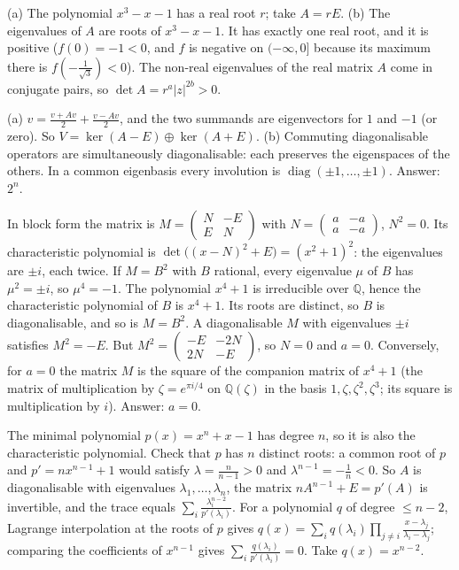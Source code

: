 \documentclass[11pt,a4paper]{article}
\begin{document}
(a) The polynomial \(x^3-x-1\) has a real root \(r\); take \(A=rE\).
(b) The eigenvalues of \(A\) are roots of \(x^3-x-1\). It has exactly one real root, and it is positive (\(f(0)=-1\lt0\), and \(f\) is negative on \((-\infty,0]\) because its maximum there is \(f(-\frac1{\sqrt3})\lt0\)). The non-real eigenvalues of the real matrix \(A\) come in conjugate pairs, so \(\det A=r^a|z|^{2b}\gt0\).

(a) \(v=\frac{v+Av}2+\frac{v-Av}2\), and the two summands are eigenvectors for \(1\) and \(-1\) (or zero). So \(V=\ker(A-E)\oplus\ker(A+E)\).
(b) Commuting diagonalisable operators are simultaneously diagonalisable: each preserves the eigenspaces of the others. In a common eigenbasis every involution is \(\operatorname{diag}(\pm1,\dots,\pm1)\). Answer: \(2^n\).

In block form the matrix is \(M=\begin{pmatrix}N&-E\\E&N\end{pmatrix}\) with \(N=\begin{pmatrix}a&-a\\a&-a\end{pmatrix}\), \(N^2=0\). Its characteristic polynomial is \(\det\bigl((x-N)^2+E\bigr)=(x^2+1)^2\): the eigenvalues are \(\pm i\), each twice.
If \(M=B^2\) with \(B\) rational, every eigenvalue \(\mu\) of \(B\) has \(\mu^2=\pm i\), so \(\mu^4=-1\). The polynomial \(x^4+1\) is irreducible over \(\mathbb Q\), hence the characteristic polynomial of \(B\) is \(x^4+1\). Its roots are distinct, so \(B\) is diagonalisable, and so is \(M=B^2\).
A diagonalisable \(M\) with eigenvalues \(\pm i\) satisfies \(M^2=-E\). But \(M^2=\begin{pmatrix}-E&-2N\\2N&-E\end{pmatrix}\), so \(N=0\) and \(a=0\). Conversely, for \(a=0\) the matrix \(M\) is the square of the companion matrix of \(x^4+1\) (the matrix of multiplication by \(\zeta=e^{\pi i/4}\) on \(\mathbb Q(\zeta)\) in the basis \(1,\zeta,\zeta^2,\zeta^3\); its square is multiplication by \(i\)). Answer: \(a=0\).

The minimal polynomial \(p(x)=x^n+x-1\) has degree \(n\), so it is also the characteristic polynomial. Check that \(p\) has \(n\) distinct roots: a common root of \(p\) and \(p'=nx^{n-1}+1\) would satisfy \(\lambda=\frac n{n-1}>0\) and \(\lambda^{n-1}=-\frac1n\lt0\).
So \(A\) is diagonalisable with eigenvalues \(\lambda_1,\dots,\lambda_n\), the matrix \(nA^{n-1}+E=p'(A)\) is invertible, and the trace equals \(\sum_i\frac{\lambda_i^{n-2}}{p'(\lambda_i)}\).
For a polynomial \(q\) of degree \(\le n-2\), Lagrange interpolation at the roots of \(p\) gives \(q(x)=\sum_iq(\lambda_i)\prod_{j\ne i}\frac{x-\lambda_j}{\lambda_i-\lambda_j}\); comparing the coefficients of \(x^{n-1}\) gives \(\sum_i\frac{q(\lambda_i)}{p'(\lambda_i)}=0\). Take \(q(x)=x^{n-2}\).
\end{document}
